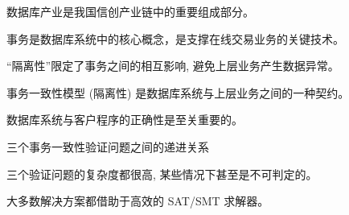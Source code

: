 
\begin{frame}{}
	\begin{center}
		数据库产业是我国信创产业链中的重要组成部分。

		\vspace{0.20cm}
	\end{center}
\end{frame}

\begin{frame}{}
	\begin{center}
		事务是数据库系统中的核心概念，是支撑在线交易业务的关键技术。

		\vspace{0.30cm}
	\end{center}
\end{frame}

\begin{frame}{}
	\begin{center}
		``隔离性''限定了事务之间的相互影响, 避免上层业务产生数据异常。

		\vspace{0.20cm}
	\end{center}
\end{frame}

\begin{frame}{}
	\begin{center}
		事务一致性模型 (隔离性) 是数据库系统与上层业务之间的一种契约。

		\vspace{0.20cm}
	\end{center}
\end{frame}

\begin{frame}{}
	\begin{center}
		数据库系统与客户程序的正确性是至关重要的。


		三个事务一致性验证问题之间的递进关系
	\end{center}
\end{frame}

\begin{frame}{}
	\begin{center}
		三个验证问题的复杂度都很高, 某些情况下甚至是不可判定的。

		\vspace{0.30cm}
		\vspace{0.30cm}

		大多数解决方案都借助于高效的 SAT/SMT 求解器。
	\end{center}
\end{frame}
